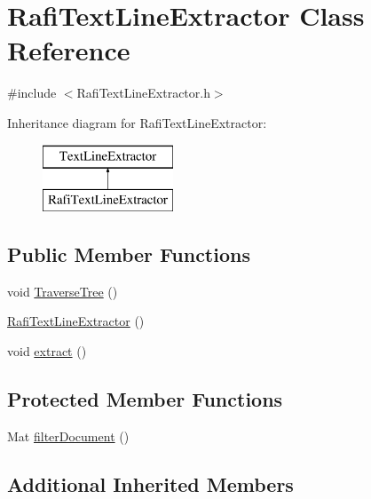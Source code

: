 \hypertarget{class_rafi_text_line_extractor}{\section{Rafi\+Text\+Line\+Extractor Class Reference}
\label{class_rafi_text_line_extractor}
}


{\ttfamily \#include $<$Rafi\+Text\+Line\+Extractor.\+h$>$}

Inheritance diagram for Rafi\+Text\+Line\+Extractor\+:\begin{figure}[H]
\begin{center}
\leavevmode
\includegraphics[height=2.000000cm]{class_rafi_text_line_extractor}
\end{center}
\end{figure}
\subsection*{Public Member Functions}
\begin{DoxyCompactItemize}
\item 
void \hyperlink{class_rafi_text_line_extractor_a96292e5e16014f1e48cf4754bf130d1f}{Traverse\+Tree} ()
\item 
\hyperlink{class_rafi_text_line_extractor_a7bbeb76ff90b68710376be91fddb95c9}{Rafi\+Text\+Line\+Extractor} ()
\item 
void \hyperlink{class_rafi_text_line_extractor_aec2e65306e243dfdf0675fb6987ff730}{extract} ()
\end{DoxyCompactItemize}
\subsection*{Protected Member Functions}
\begin{DoxyCompactItemize}
\item 
Mat \hyperlink{class_rafi_text_line_extractor_a4a5f293ba87e2c80d9e02b38050351ea}{filter\+Document} ()
\end{DoxyCompactItemize}
\subsection*{Additional Inherited Members}



